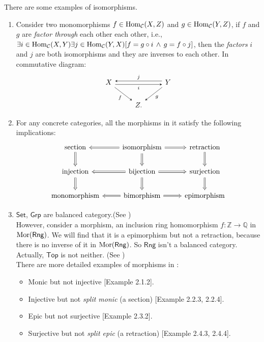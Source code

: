 \documentclass{article}
\begin{document}
\begin{exm}\label{exm3}
	There are some examples of isomorphisms.
	\begin{enumerate}
		\item Consider two monomorphisms $f\in\mathrm{Hom}_{\mathcal{C}}(X,Z)$ and $g\in\mathrm{Hom}_{\mathcal{C}}(Y,Z)$, if $f$ and $g$ are \emph{factor through} each other each other, i.e., $\exists i\in\mathrm{Hom}_{\mathcal{C}}(X,Y)\exists j\in\mathrm{Hom}_{\mathcal{C}}(Y,X)[f=g\circ i\,\wedge\,g=f\circ j]$, then the \emph{factors} $i$ and $j$ are both isomorphisms and they are inverses to each other. In commutative diagram:
		\[\begin{tikzcd}
			X \arrow[->,>=stealth, rr, "i"', shift right] \arrow[->,>=stealth, rd, "f"'] & &
			Y \arrow[->,>=stealth, ll, "j"', shift right] \arrow[->,>=stealth, ld, "g"]\\ &
			Z. &
		\end{tikzcd}\]
		
		\item For any concrete categories, all the morphisms in it satisfy the following implications:
		\[\begin{tikzcd}
			\text{section} \arrow[d, Rightarrow] &
				\text{isomorphism} \arrow[r, Rightarrow] \arrow[l, Rightarrow] \arrow[d, Rightarrow] &
				\text{retraction} \arrow[d, Rightarrow]\\
			\text{injection} \arrow[d, Rightarrow] &
				\text{bijection} \arrow[l, Rightarrow] \arrow[r, Rightarrow] \arrow[d, Rightarrow] &
				\text{surjection} \arrow[d, Rightarrow]\\
			\text{monomorphism} &
				\text{bimorphism} \arrow[r, Rightarrow] \arrow[l, Rightarrow] &
				\text{epimorphism}
		\end{tikzcd}\]
		
		\item $\mathsf{Set}$, $\mathsf{Grp}$ are balanced category.(See \cite[Theorem 2.5.2]{cat-8})\\
		However, consider a morphism, an inclusion ring homomorphism $f:\mathbb{Z}\to\mathbb{Q}$ in $\mathrm{Mor}(\mathsf{Rng})$. We will find that it is a epimorphism but not a retraction, because there is no inverse of it in $\mathrm{Mor}(\mathsf{Rng})$. So $\mathsf{Rng}$ isn't a balanced category. Actually, $\mathsf{Top}$ is not neither. (See \cite[p19]{cat-8})\\
		There are more detailed examples of morphisms in \cite{cat-8}:
		\begin{itemize}
			\item Monic but not injective [Example 2.1.2].
			\item Injective but not \emph{split monic} (a section) [Example 2.2.3, 2.2.4].
			\item Epic but not surjective [Example 2.3.2].
			\item Surjective but not \emph{split epic} (a retraction) [Example 2.4.3, 2.4.4].
		\end{itemize}
	\end{enumerate}
\end{exm}
\end{document}
